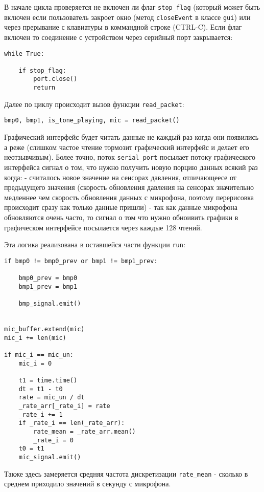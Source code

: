\documentclass[../main.tex]{subfiles}
\begin{document}
В начале цикла проверяется не включен ли флаг \texttt{stop\_flag} (который может быть включен если пользователь закроет окно (метод \texttt{closeEvent} в классе \texttt{gui}) или через прерывание с клавиатуры в коммандной строке (CTRL-C). Если флаг включен то соединение с устройством через серийный порт закрывается:

\begin{lstlisting}
while True:

    if stop_flag:
        port.close()
        return
\end{lstlisting}

Далее по циклу происходит вызов функции \texttt{read\_packet}:
\begin{lstlisting}
bmp0, bmp1, is_tone_playing, mic = read_packet()
\end{lstlisting}

Графический интерфейс будет читать данные не каждый раз когда они появились а реже (слишком частое чтение тормозит графический интерфейс и делает его неотзывчивым). Более точно, поток \texttt{serial\_port} посылает потоку графического интерфейса сигнал о том, что нужно получить новую порцию данных всякий раз когда:
- считалось новое значение на сенсорах давления, отличающеесе от предыдущего значения (скорость обновления давления на сенсорах значительно медленнее чем скорость обновления данных с микрофона, поэтому перерисовка происходит сразу как только данные пришли)
- так как данные микрофона обновляются очень часто, то сигнал о том что нужно обноивить графики в графическом интерфейсе посылается через каждые 128 чтений.

Эта логика реализована в оставшейся части функции \texttt{run}:

\begin{lstlisting}
if bmp0 != bmp0_prev or bmp1 != bmp1_prev:

    bmp0_prev = bmp0
    bmp1_prev = bmp1

    bmp_signal.emit()


mic_buffer.extend(mic)
mic_i += len(mic)

if mic_i == mic_un:
    mic_i = 0

    t1 = time.time()
    dt = t1 - t0
    rate = mic_un / dt
    _rate_arr[_rate_i] = rate
    _rate_i += 1
    if _rate_i == len(_rate_arr):
        rate_mean = _rate_arr.mean()
        _rate_i = 0
    t0 = t1
    mic_signal.emit()
\end{lstlisting}

Также здесь замеряется средняя частота дискретизации \texttt{rate\_mean} - сколько в среднем приходило значений в секунду с микрофона.
\end{document}
